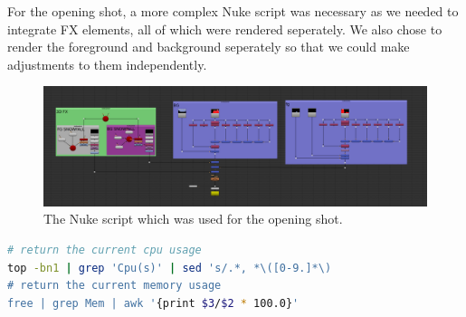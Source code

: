 \documentclass[11pt]{article}
\begin{document}
For the opening shot, a more complex Nuke script was necessary as we needed to integrate FX elements, all of which were rendered seperately. We also chose to render the foreground and background seperately so that we could make adjustments to them independently.
\begin{figure}[htbp]\centering
	\includegraphics[width=1.0\linewidth]{images/shot010comp.png}
	\caption{\label{figure:shot010comp} The Nuke script which was used for the opening shot.}
\end{figure}




\newpage
\appendix

\begin{lstlisting}[language=bash, label={lst:cpumem}, caption={Extract from the Python script used to determine which of the computers on the university network are suitable for rendering on. By capturing the output of the following commands I was able to get the current CPU and memory usage.}]
# return the current cpu usage
top -bn1 | grep 'Cpu(s)' | sed 's/.*, *\([0-9.]*\)
# return the current memory usage
free | grep Mem | awk '{print $3/$2 * 100.0}'
\end{lstlisting}
\end{document}
